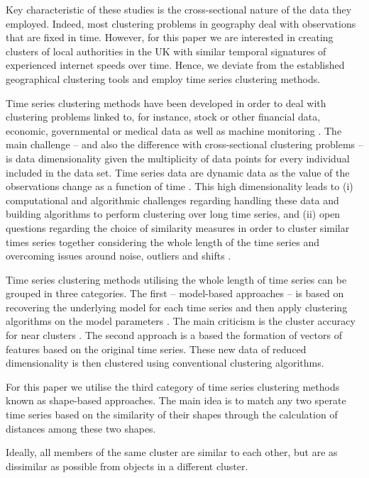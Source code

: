 \documentclass[]{interact}
\theoremstyle{plain}%
\theoremstyle{definition}
\theoremstyle{remark}
\begin{document}
Key characteristic of these studies is the cross-sectional nature of the
data they employed. Indeed, most clustering problems in geography deal
with observations that are fixed in time. However, for this paper we are
interested in creating clusters of local authorities in the UK with
similar temporal signatures of experienced internet speeds over time.
Hence, we deviate from the established geographical clustering tools and
employ time series clustering methods.

Time series clustering methods have been developed in order to deal with
clustering problems linked to, for instance, stock or other financial
data, economic, governmental or medical data as well as machine
monitoring
\citep{aggarwal2013time, aggarwal2001surprising, hyndman2015large, WARRENLIAO20051857}.
The main challenge -- and also the difference with cross-sectional
clustering problems -- is data dimensionality given the multiplicity of
data points for every individual included in the data set. Time series
data are dynamic data as the value of the observations change as a
function of time \citep{aghabozorgi2015time}. This high dimensionality
leads to (i) computational and algorithmic challenges regarding handling
these data and building algorithms to perform clustering over long time
series, and (ii) open questions regarding the choice of similarity
measures in order to cluster similar times series together considering
the whole length of the time series and overcoming issues around noise,
outliers and shifts \citep{lin2004iterative, aghabozorgi2015time}.

Time series clustering methods utilising the whole length of time series
can be grouped in three categories. The first -- model-based approaches
-- is based on recovering the underlying model for each time series and
then apply clustering algorithms on the model parameters
\citep{aghabozorgi2015time}. The main criticism is the cluster accuracy
for near clusters \citep{mitsa2010temporal}. The second approach is a
based the formation of vectors of features based on the original time
series. These new data of reduced dimensionality is then clustered using
conventional clustering algorithms.

For this paper we utilise the third category of time series clustering
methods known as shape-based approaches. The main idea is to match any
two sperate time series based on the similarity of their shapes through
the calculation of distances among these two shapes.

\citet{sardatime} Ideally, all members of the same cluster are similar
to each other, but are as dissimilar as possible from objects in a
different cluster.
\end{document}
